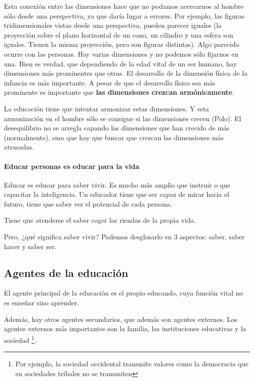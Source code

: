 \documentclass[palatino]{apuntesURJC}
\begin{document}
Esta conexión entre las dimensiones hace que no podamos acercarnos al hombre sólo desde una perspectiva, ya que daría lugar a errores.
%
Por ejemplo, las figuras tridimensionales vistas desde una perspectiva, pueden parecer iguales (la proyección sobre el plano horizontal de un cono, un cilindro y una esfera son iguales. Tienen la misma proyección, pero son figuras distintas).
%
Algo parecido ocurre con las personas.
%
Hay varias dimensiones y no podemos sólo fijarnos en una. 
%
Bien es verdad, que dependiendo de la edad vital de un ser humano, hay dimensiones más prominentes que otras.
%
El desarrollo de la dimensión física de la infancia es más importante.
%
A pesar de que el desarrollo físico sea más prominente es importante que \textbf{las  dimensiones crezcan armónicamente}.

La educación tiene que intentar armonizar estas dimensiones.
%
Y esta armonización en el hombre sólo se consigue si las dimensiones crecen (Polo).
%
El desequilibrio no se arregla capando las dimensiones que han crecido de más (normalmente), sino que hay que buscar que crezcan las dimensiones más atrasadas.

\paragraph{Educar personas es educar para la vida}
Educar es educar para saber vivir. 
%
Es mucho más amplio que instruir o que capacitar la inteligencia.
%
Un educador tiene que ser capaz de mirar hacia el futuro, tiene que saber ver el potencial de cada persona.



Tiene que atenderse el saber coger las riendas de la propia vida.


Pero, ¿qué significa saber vivir? Podemos desglosarlo en 3 aspectos: saber, saber hacer y saber ser.
%


\subsection{Agentes de la educación}

El agente principal de la educación es el propio educando, cuya función vital no es enseñar sino aprender.


Además, hay otros agentes secundarios, que además son agentes externos.
%
Los agentes externos más importantes son la familia, las instituciones educativas y la sociedad
%
\footnote{Por ejemplo, la sociedad occidental transmite valores como la democracia que en sociedades tribales no se transmiten}.
\end{document}
